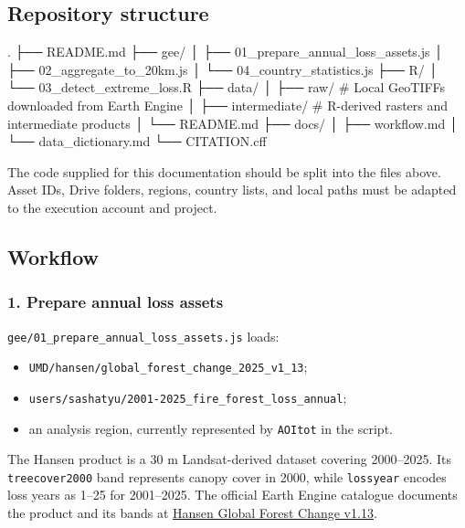 \documentclass[
]{article}
\newenvironment{Shaded}{\begin{snugshade}}{\end{snugshade}}
\newcommand{\NormalTok}[1]{#1}
\providecommand{\tightlist}{%
  \setlength{\itemsep}{0pt}\setlength{\parskip}{0pt}}
\begin{document}
\subsection{Repository structure}\label{repository-structure}

\begin{Shaded}
\begin{Highlighting}[]
\NormalTok{.}
\NormalTok{├── README.md}
\NormalTok{├── gee/}
\NormalTok{│   ├── 01\_prepare\_annual\_loss\_assets.js}
\NormalTok{│   ├── 02\_aggregate\_to\_20km.js}
\NormalTok{│   └── 04\_country\_statistics.js}
\NormalTok{├── R/}
\NormalTok{│   └── 03\_detect\_extreme\_loss.R}
\NormalTok{├── data/}
\NormalTok{│   ├── raw/                 \# Local GeoTIFFs downloaded from Earth Engine}
\NormalTok{│   ├── intermediate/        \# R{-}derived rasters and intermediate products}
\NormalTok{│   └── README.md}
\NormalTok{├── docs/}
\NormalTok{│   ├── workflow.md}
\NormalTok{│   └── data\_dictionary.md}
\NormalTok{└── CITATION.cff}
\end{Highlighting}
\end{Shaded}

The code supplied for this documentation should be split into the files
above. Asset IDs, Drive folders, regions, country lists, and local paths
must be adapted to the execution account and project.

\subsection{Workflow}\label{workflow}

\subsubsection{1. Prepare annual loss
assets}\label{prepare-annual-loss-assets}

\texttt{gee/01\_prepare\_annual\_loss\_assets.js} loads:

\begin{itemize}
\tightlist
\item
  \texttt{UMD/hansen/global\_forest\_change\_2025\_v1\_13};
\item
  \texttt{users/sashatyu/2001-2025\_fire\_forest\_loss\_annual};
\item
  an analysis region, currently represented by \texttt{AOItot} in the
  script.
\end{itemize}

The Hansen product is a 30 m Landsat-derived dataset covering
2000--2025. Its \texttt{treecover2000} band represents canopy cover in
2000, while \texttt{lossyear} encodes loss years as 1--25 for
2001--2025. The official Earth Engine catalogue documents the product
and its bands at
\href{https://developers.google.com/earth-engine/datasets/catalog/UMD_hansen_global_forest_change_2025_v1_13}{Hansen
Global Forest Change v1.13}.
\end{document}
